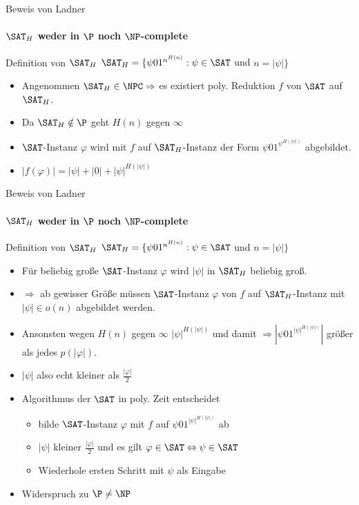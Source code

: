 \begin{frame}{Beweis von Ladner}
		\framesubtitle{${\SAT}_H$ weder in $\P$ noch $\NP$-complete}
	
		\begin{KITinfoblock}{Definition von ${\SAT}_H$}	
			${\SAT}_H = \lbrace \psi 01^{n^{H(n)}} : \psi \in \SAT$ und $ n = |\psi| \rbrace$
		\end{KITinfoblock}
		
		
		\bigskip
		\pause
		\bigskip
		
		\begin{itemize}[<+->]
			\item Angenommen ${\SAT}_H \in \NPC \Rightarrow $ es existiert poly. Reduktion $f$ von $\SAT$ auf ${\SAT}_H$.
			\item Da ${\SAT}_H \notin \P $ geht $H(n)$ gegen $\infty$ 
			\item $\SAT$-Instanz $\varphi$ wird mit $f$ auf ${\SAT}_H$-Instanz der Form $\psi01^{{\psi}^{H(|\psi|)}}$ abgebildet.
			\item $|f(\varphi)|=|\psi| + |0| + {|\psi|}^{H(|\psi|)}$
		\end{itemize}
\end{frame}
\begin{frame}{Beweis von Ladner}
	\framesubtitle{${\SAT}_H$ weder in $\P$ noch $\NP$-complete}
	
	\begin{KITinfoblock}{Definition von ${\SAT}_H$}	
		${\SAT}_H = \lbrace \psi 01^{n^{H(n)}} : \psi \in \SAT$ und $ n = |\psi| \rbrace$
	\end{KITinfoblock}
		\begin{itemize}[<+->]
		\item Für beliebig große $\SAT$-Instanz $\varphi$ wird $|\psi|$ in ${\SAT}_H$ beliebig groß.
		\item $\Rightarrow$ ab gewisser Größe müssen $\SAT$-Instanz $\varphi$ von $f$ auf ${\SAT}_H$-Instanz mit $|\psi| \in o(n)$  abgebildet werden.
		 
		\item Ansonsten wegen $H(n)$ gegen $\infty$ \newline ${|\psi|}^{H(|\psi|)}$  und damit $ \Rightarrow|\psi01^{|\psi|^{H(|\psi|)}} |$  größer als jedes $p(|\varphi|)$.
		\item $|\psi|$ also echt kleiner als $\frac{|\varphi|}{2}$
		\item Algorithmus der $\SAT$ in poly. Zeit entscheidet 
			\begin{itemize}
				\item bilde $\SAT$-Instanz $\varphi$ mit $f$ auf $\psi01^{|\psi|^{H(|\psi|)}}$ ab
				\item $|\psi|$ kleiner $\frac{|\varphi|}{2}$ und es gilt $\varphi \in \SAT \Leftrightarrow \psi \in \SAT$ 
				\item Wiederhole ersten Schritt mit $\psi$ als Eingabe
			\end{itemize}
		\item Widerspruch zu $\P \neq \NP$
		\end{itemize}
\end{frame}
